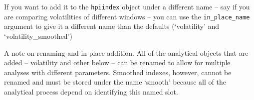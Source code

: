 \documentclass[]{article}
\newenvironment{Shaded}{\begin{snugshade}}{\end{snugshade}}
\newcommand{\DataTypeTok}[1]{\textcolor[rgb]{0.13,0.29,0.53}{#1}}
\newcommand{\DecValTok}[1]{\textcolor[rgb]{0.00,0.00,0.81}{#1}}
\newcommand{\KeywordTok}[1]{\textcolor[rgb]{0.13,0.29,0.53}{\textbf{#1}}}
\newcommand{\NormalTok}[1]{#1}
\newcommand{\OperatorTok}[1]{\textcolor[rgb]{0.81,0.36,0.00}{\textbf{#1}}}
\newcommand{\OtherTok}[1]{\textcolor[rgb]{0.56,0.35,0.01}{#1}}
\newcommand{\StringTok}[1]{\textcolor[rgb]{0.31,0.60,0.02}{#1}}
\begin{document}
\begin{Shaded}
\end{Shaded}

If you want to add it to the \texttt{hpiindex} object under a different
name -- say if you are comparing volatilities of different windows --
you can use the \texttt{in\_place\_name} argument to give it a different
name than the defaults (`volatility' and `volatility\_smoothed')

\begin{Shaded}
\end{Shaded}

A note on renaming and in place addition. All of the analytical objects
that are added -- volatility and other below -- can be renamed to allow
for multiple analyses with different parameters. Smoothed indexes,
however, cannot be renamed and must be stored under the name `smooth'
because all of the analytical process depend on identifying this named
slot.
\end{document}
